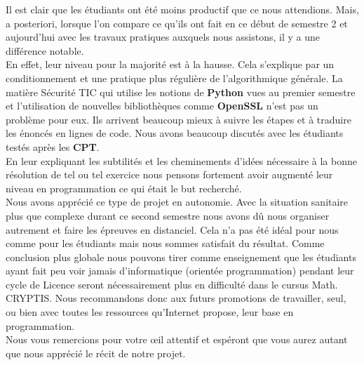 \documentclass[12pt]{article}
\begin{document}
Il est clair que les étudiants ont été moins productif que ce nous attendions. Mais, a posteriori, lorsque l'on compare ce qu'ils ont fait en ce début de semestre 2 et aujourd'hui avec les travaux pratiques auxquels nous assistons, il y a une différence notable.\\

En effet, leur niveau pour la majorité est à la hausse. Cela s'explique par un conditionnement et une pratique plus régulière de l'algorithmique générale. La matière \textsf{Sécurité TIC} qui utilise les notions de \textbf{Python} vues au premier semestre et l'utilisation de nouvelles bibliothèques comme \textbf{OpenSSL} n'est pas un problème pour eux. Ils arrivent beaucoup mieux à suivre les étapes et à traduire les énoncés en lignes de code. Nous avons beaucoup discutés avec les étudiants testés après les \textbf{CPT}.\\

 En leur expliquant les subtilités et les cheminements d'idées nécessaire à la bonne résolution de tel ou tel exercice nous pensons fortement avoir augmenté leur niveau en programmation ce qui était le but recherché.\\
 
Nous avons apprécié ce type de projet en autonomie. Avec la situation sanitaire plus que complexe durant ce second semestre nous avons dû nous organiser autrement et faire les épreuves en distanciel. Cela n'a pas été idéal pour nous comme pour les étudiants mais nous sommes satisfait du résultat. Comme conclusion plus globale nous pouvons tirer comme enseignement que les étudiants ayant fait peu voir jamais d'informatique (orientée programmation) pendant leur cycle de Licence seront nécessairement plus en difficulté dans le cursus \textsf{Math. CRYPTIS}. Nous recommandons donc aux futurs promotions de travailler, seul, ou bien avec toutes les ressources qu'Internet propose, leur base en programmation.\\

Nous vous remercions pour votre œil attentif et espéront que vous aurez autant que nous apprécié le récit de notre projet.
\end{document}
